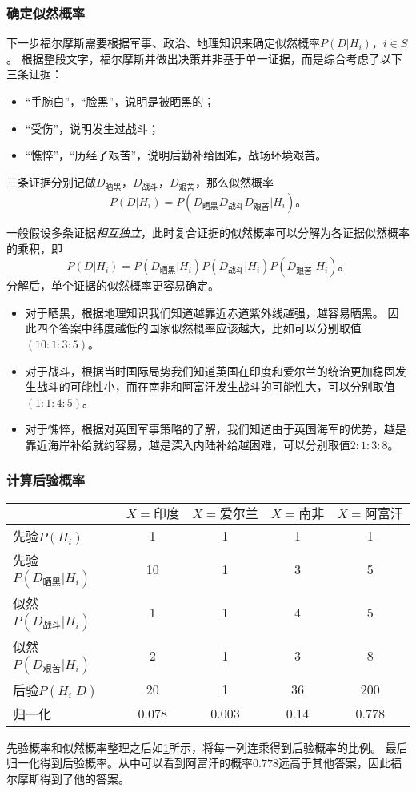 \subsubsection{确定似然概率}

下一步福尔摩斯需要根据军事、政治、地理知识来确定似然概率$P(D|H_i)，i\in S$。
根据整段文字，福尔摩斯并做出决策并非基于单一证据，而是综合考虑了以下三条证据：
\begin{itemize}
    \item “手腕白”，“脸黑”，说明是被晒黑的；
    \item “受伤”，说明发生过战斗；
    \item “憔悴”，“历经了艰苦”，说明后勤补给困难，战场环境艰苦。
\end{itemize}
三条证据分别记做$D_{晒黑}$，$D_{战斗}$，$D_{艰苦}$，那么似然概率
\begin{equation*}
    P(D|H_i)=P(D_{晒黑}D_{战斗}D_{艰苦}|H_i)。
\end{equation*}

一般假设多条证据\emph{相互独立}，此时复合证据的似然概率可以分解为各证据似然概率的乘积，即
\begin{equation}
    P(D|H_i)=P(D_{晒黑}|H_i)P(D_{战斗}|H_i)P(D_{艰苦}|H_i)。
\end{equation}
分解后，单个证据的似然概率更容易确定。
\begin{itemize}
    \item 对于晒黑，根据地理知识我们知道越靠近赤道紫外线越强，越容易晒黑。
    因此四个答案中纬度越低的国家似然概率应该越大，比如可以分别取值$(10:1:3:5)$。
    \item 对于战斗，根据当时国际局势我们知道英国在印度和爱尔兰的统治更加稳固发生战斗的可能性小，而在南非和阿富汗发生战斗的可能性大，可以分别取值$(1:1:4:5)$。
    \item 对于憔悴，根据对英国军事策略的了解，我们知道由于英国海军的优势，越是靠近海岸补给就约容易，越是深入内陆补给越困难，可以分别取值$2:1:3:8$。
\end{itemize}

\subsubsection{计算后验概率}
\begin{table}
    \ContinuedFloat* %
    \begin{tabular}{lcccc}
        \toprule
        & $X=印度$ & $X=爱尔兰$ & $X=南非$ & $X=阿富汗$\\
        \midrule
        先验$P(H_i)$ & 1 & 1 & 1 & 1\\
        先验$P(D_{晒黑}|H_i)$ & 10 & 1 & 3 & 5 \\
        似然$P(D_{战斗}|H_i)$ & 1 & 1 & 4 & 5\\
        似然$P(D_{艰苦}|H_i)$ & 2 & 1 & 3 & 8\\
        \midrule
        后验$P(H_i|D)$ & 20 & 1 & 36 & 200\\
        归一化 & 0.078 & 0.003 & 0.14 & 0.778\\
        \bottomrule
    \end{tabular}
    \label{tab:bayes}
\end{table}

先验概率和似然概率整理之后如\cref{tab:bayes}所示，将每一列连乘得到后验概率的比例。
最后归一化得到后验概率。从中可以看到阿富汗的概率$0.778$远高于其他答案，因此福尔摩斯得到了他的答案。


